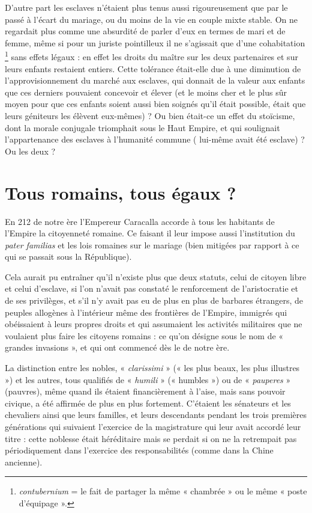  D'autre part les esclaves n'étaient plus tenus aussi rigoureusement que par le passé à l'écart du mariage, ou du moins de la vie en couple mixte stable. On ne regardait plus comme une absurdité de parler d'eux en termes de mari et de femme, même si pour un juriste pointilleux il ne s'agissait que d'une cohabitation%
\footnote{\emph{contubernium} = le fait de partager la même « chambrée » ou le même « poste d'équipage ».}
sans effets légaux : en effet les droits du maître sur les deux partenaires et sur leurs enfants restaient entiers. Cette tolérance était-elle due à une diminution de l'approvisionnement du marché aux esclaves, qui donnait de la valeur aux enfants que ces derniers pouvaient concevoir et élever (et le moins cher et le plus sûr moyen pour que ces enfants soient aussi bien soignés qu'il était possible, était que leurs géniteurs les élèvent eux-mêmes) ? Ou bien était-ce un effet du stoïcisme, dont la morale conjugale triomphait sous le Haut Empire, et qui soulignait l'appartenance des esclaves à l'humanité commune ( lui-même avait été esclave) ? Ou les deux ? 
 
\section{Tous romains, tous égaux ?}

 En 212 de notre ère l'Empereur Caracalla accorde à tous les habitants de l'Empire la citoyenneté romaine. Ce faisant il leur impose aussi l'institution du \emph{pater familias} et les lois romaines sur le mariage (bien mitigées par rapport à ce qui se passait sous la République). 

 Cela aurait pu entraîner qu'il n'existe plus que deux statuts, celui de citoyen libre et celui d'esclave, si l'on n'avait pas constaté le renforcement de l'aristocratie et de ses privilèges, et s'il n'y avait pas eu de plus en plus de barbares étrangers, de peuples allogènes à l'intérieur même des frontières de l'Empire, immigrés qui obéissaient à leurs propres droits et qui assumaient les activités militaires que ne voulaient plus faire les citoyens romains : ce qu'on désigne sous le nom de « grandes invasions », et qui ont commencé dès le  de notre ère. 

 La distinction entre les nobles, « \emph{clarissimi} » (« les plus beaux, les plus illustres ») et les autres, tous qualifiés de « \emph{humili} » (« humbles ») ou de « \emph{pauperes} » (pauvres), même quand ils étaient financièrement à l'aise, mais sans pouvoir civique, a été affirmée de plus en plus fortement. C'étaient les sénateurs et les chevaliers ainsi que leurs familles, et leurs descendants pendant les trois premières générations qui suivaient l'exercice de la magistrature qui leur avait accordé leur titre : cette noblesse était héréditaire mais se perdait si on ne la retrempait pas périodiquement dans l'exercice des responsabilités (comme dans la Chine ancienne).

